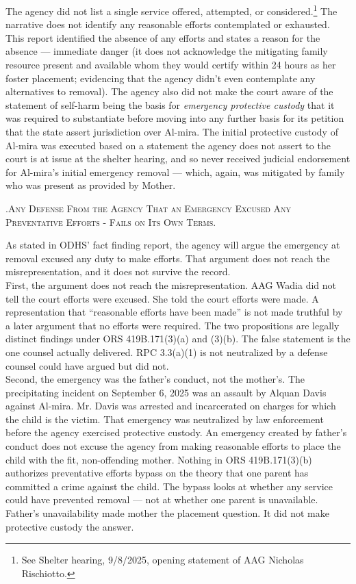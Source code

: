 \documentclass[10pt,a4paper,roman]{moderncv}
\newcounter{legalsection}
\newcounter{legalsubsection}[legalsection]
\newcounter{legalsubsubsection}[legalsubsection]
\renewcommand{\thelegalsubsubsection}{\roman{legalsubsubsection}}
\newcommand{\legalsubsubsection}[1]{%
	\refstepcounter{legalsubsubsection}%
	\par\addvspace{0.55em}%
	{\color{inkblue!88!black}\normalfont\small\scshape
		\thelegalsubsubsection.\hspace{0.35em}#1\par}%
	\vspace{0.1em}%
}
\begin{document}
\begin{enumerate}[leftmargin=*,itemsep=0.35em,topsep=0.3em,resume]
The agency did not list a single service offered, attempted, or considered.\footnote{See Shelter hearing, 9/8/2025, opening statement of AAG Nicholas Rischiotto.} The narrative does not identify any reasonable efforts contemplated or exhausted. This report identified the absence of any efforts and states a reason for the absence --- immediate danger (it does not acknowledge the mitigating family resource present and available whom they would certify within 24 hours as her foster placement; evidencing that the agency didn't even contemplate any alternatives to removal). The agency also did not make the court aware of the statement of self-harm being the basis for \textit{emergency protective custody} that it was required to substantiate before moving into any further basis for its petition that the state assert jurisdiction over Al-mira. The initial protective custody of Al-mira was executed based on a statement the agency does not assert to the court is at issue at the shelter hearing, and so never received judicial endorsement for Al-mira's initial emergency removal --- which, again, was mitigated by family who was present as provided by Mother.\\

\legalsubsubsection{Any Defense From the Agency That an Emergency Excused Any Preventative Efforts - Fails on Its Own Terms.}
As stated in ODHS' fact finding report, the agency will argue the emergency at removal excused any duty to make efforts. That argument does not reach the misrepresentation, and it does not survive the record.\\

First, the argument does not reach the misrepresentation. AAG Wadia did not tell the court efforts were excused. She told the court efforts were made. A representation that ``reasonable efforts have been made'' is not made truthful by a later argument that no efforts were required. The two propositions are legally distinct findings under ORS 419B.171(3)(a) and (3)(b). The false statement is the one counsel actually delivered. RPC 3.3(a)(1) is not neutralized by a defense counsel could have argued but did not.\\

Second, the emergency was the father's conduct, not the mother's. The precipitating incident on September 6, 2025 was an assault by Alquan Davis against Al-mira. Mr. Davis was arrested and incarcerated on charges for which the child is the victim. That emergency was neutralized by law enforcement before the agency exercised protective custody. An emergency created by father's conduct does not excuse the agency from making reasonable efforts to place the child with the fit, non-offending mother. Nothing in ORS 419B.171(3)(b) authorizes preventative efforts bypass on the theory that one parent has committed a crime against the child. The bypass looks at whether any service could have prevented removal --- not at whether one parent is unavailable. Father's unavailability made mother the placement question. It did not make protective custody the answer.


\end{enumerate}
\end{document}
